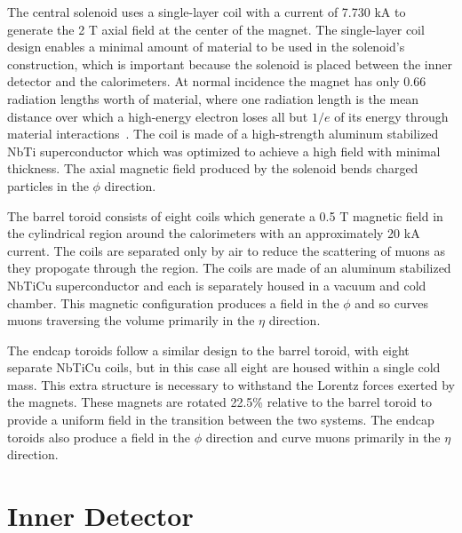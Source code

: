 The central solenoid uses a single-layer coil with a current of 7.730 kA to generate the 2 T axial field at the center of the magnet. 
The single-layer coil design enables a minimal amount of material to be used in the solenoid's construction, which is important because the solenoid is placed between the inner detector and the calorimeters.
At normal incidence the magnet has only 0.66 radiation lengths worth of material, where one radiation length is the mean distance over which a high-energy electron loses all but $1/e$ of its energy through material interactions~\cite{pdg}.
The coil is made of a high-strength aluminum stabilized NbTi superconductor which was optimized to achieve a high field with minimal thickness.
The axial magnetic field produced by the solenoid bends charged particles in the $\phi$ direction.

The barrel toroid consists of eight coils which generate a 0.5 T magnetic field in the cylindrical region around the calorimeters with an approximately 20 kA current.
The coils are separated only by air to reduce the scattering of muons as they propogate through the region.
The coils are made of an aluminum stabilized NbTiCu superconductor and each is separately housed in a vacuum and cold chamber.
This magnetic configuration produces a field in the $\phi$ and so curves muons traversing the volume primarily in the $\eta$ direction.

The endcap toroids follow a similar design to the barrel toroid, with eight separate NbTiCu coils, but in this case all eight are housed within a single cold mass.
This extra structure is necessary to withstand the Lorentz forces exerted by the magnets. 
These magnets are rotated 22.5\% relative to the barrel toroid to provide a uniform field in the transition between the two systems. 
The endcap toroids also produce a field in the $\phi$ direction and curve muons primarily in the $\eta$ direction.


\section{Inner Detector}
\label{sec:inner_detector}

